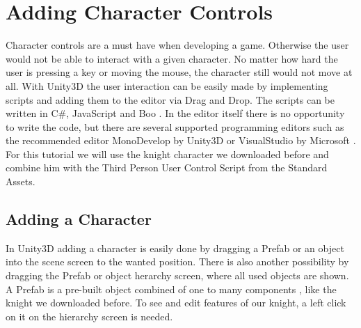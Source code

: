 \documentclass[12pt, a4paper, titlepage]{article}
\newcommand{\csh}{C{\#}}
\begin{document}
\section{Adding Character Controls}

Character controls are a must have when developing a game. Otherwise the user would not be able to interact with a given character. No matter how hard the user is pressing a key or moving the mouse, the character still would not move at all.
With Unity3D the user interaction can be easily made by implementing scripts and adding them to the editor via Drag and Drop. The scripts can be written in \csh, JavaScript and Boo \cite{b1}. In the editor itself there is no opportunity to write the code, but there are several supported programming editors such as the recommended editor MonoDevelop by Unity3D or VisualStudio by Microsoft \cite{b1}. \\
For this tutorial we will use the knight character we downloaded before and combine him with the Third Person User Control Script from the Standard Assets.

\subsection{Adding a Character}

In Unity3D adding a character is easily done by dragging a Prefab or an object into the scene screen to the wanted position. There is also another possibility by dragging the Prefab or object herarchy screen, where all used objects are shown. A Prefab is a pre-built object combined of one to many components \cite{b2}, like the knight we downloaded before.
To see and edit features of our knight, a left click on it on the hierarchy screen is needed. 
\end{document}
